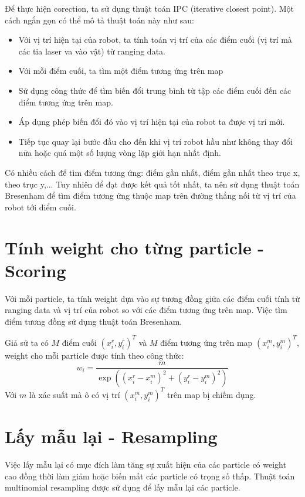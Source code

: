 \documentclass[../../main.tex]{subfiles}
\begin{document}
Để thực hiện corection, ta sử dụng thuật toán IPC (iterative closest point). Một cách ngắn gọn có thể mô tả thuật toán này như sau:
\begin{itemize}
    \item Với vị trí hiện tại của robot, ta tính toán vị trí của các điểm cuối (vị trí mà các tia laser va vào vật) từ ranging data.
    \item Với mỗi điểm cuối, ta tìm một điểm tương ứng trên map
    \item Sử dụng công thức để tìm biến đổi trung bình từ tập các điểm cuối đến các điểm tương ứng trên map.
    \item Áp dụng phép biến đổi đó vào vị trí hiện tại của robot ta được vị trí mới.
    \item Tiếp tục quay lại bước đầu cho đến khi vị trí robot hầu như không thay đổi nữa hoặc quá một số lượng vòng lặp giới hạn nhất định.
\end{itemize}

Có nhiều cách để tìm điểm tương ứng: điểm gần nhất, điểm gần nhất theo trục x, theo trục y,... Tuy nhiên để đạt được kết quả tốt nhất, ta nên sử dụng thuật toán Bresenham để tìm điểm tương ứng thuộc map trên đường thẳng nối từ vị trí của robot tới điểm cuối.

\section{Tính weight cho từng particle - Scoring}
Với mỗi particle, ta tính weight dựa vào sự tương đồng giữa các điểm cuối tính từ ranging data và vị trí của robot so với các điểm tương ứng trên map. Việc tìm điểm tương đồng sử dụng thuật toán Bresenham.

Giả sử  ta có $M$ điểm cuối $(x_i^r, y_i^r)^T$ và $M$ điểm tương ứng trên map $(x_i^m, y_i^m)^T$, weight cho mỗi particle được tính theo công thức:
\begin{equation}
    w_i = \frac{m}{\exp((x_i^r-x_i^m)^2 + (y_i^r - y_i^m)^2)}
\end{equation}
Với $m$ là xác suất mà ô có vị trí $(x_i^m, y_i^m)^T$ trên map bị chiếm dụng.

\section{Lấy mẫu lại - Resampling}
Việc lấy mẫu lại có mục đích làm tăng sự xuất hiện của các particle có weight cao đồng thời làm giảm hoặc biến mất các particle có trọng số thấp.
Thuật toán multinomial resampling được sử dụng để lấy mẫu lại các particle.
\end{document}
